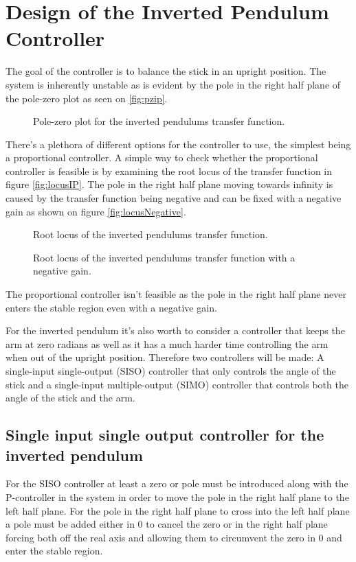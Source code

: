 \chapter{Design of the Inverted Pendulum Controller}
The goal of the controller is to balance the stick in an upright position. 
The system is inherently unstable as is evident by the pole in the right half plane of the pole-zero plot as seen on \autoref{fig:pzip}.

\begin{figure}[htbp]
\centering
\missingfigure{}
\caption{Pole-zero plot for the inverted pendulums transfer function.}
\label{fig:pzip}
\end{figure}

There's a plethora of different options for the controller to use, the simplest being a proportional controller. A simple way to check whether the proportional controller is feasible is by examining the root locus of the transfer function in figure \autoref{fig:locusIP}. The pole in the right half plane moving towards infinity is caused by the transfer function being negative and can be fixed with a negative gain as shown on figure \autoref{fig:locusNegative}.

\begin{figure}[htbp]
\centering
\missingfigure{}
\caption{Root locus of the inverted pendulums transfer function.}
\label{fig:locusIP}
\end{figure}

\begin{figure}[htbp]
\centering
\missingfigure{}
\caption{Root locus of the inverted pendulums transfer function with a negative gain.}
\label{fig:locusNegative}
\end{figure}

The proportional controller isn't feasible as the pole in the right half plane never enters the stable region even with a negative gain.

For the inverted pendulum it's also worth to consider a controller that keeps the arm at zero radians as well as it has a much harder time controlling the arm when out of the upright position. Therefore two controllers will be made: A single-input single-output (SISO) controller that only controls the angle of the stick and a single-input multiple-output (SIMO) controller that controls both the angle of the stick and the arm. 

\section{Single input single output controller for the inverted pendulum}
For the SISO controller at least a zero or pole must be introduced along with the P-controller in the system in order to move the pole in the right half plane to the left half plane. For the pole in the right half plane to cross into the left half plane a pole must be added either in 0 to cancel the zero or in the right half plane forcing both off the real axis and allowing them to circumvent the zero in 0 and enter the stable region.

